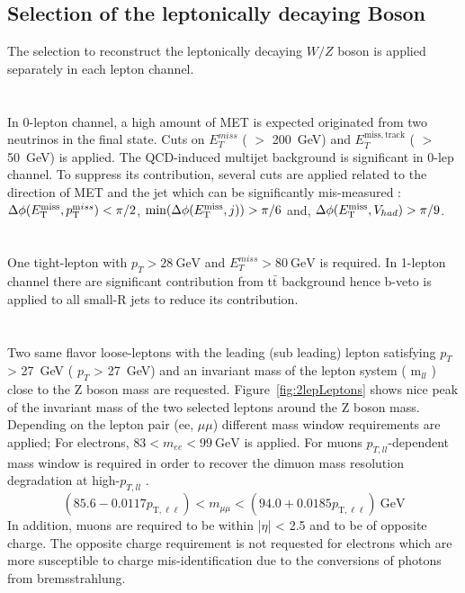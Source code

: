 \subsection{Selection of the leptonically decaying Boson}
The selection to reconstruct the leptonically decaying $W/Z$ boson is applied separately in each lepton channel. \\ \\
\noindent\textbf{}  \\
In 0-lepton channel, a high amount of MET is expected originated from two neutrinos in the final state. Cuts on $E^{miss}_T$ ( $>$ 200~GeV) and $E^{\mathrm{miss,track}}_T$ ( $>$ 50~GeV) is applied. The QCD-induced multijet background is significant in 0-lep channel. 
To suppress its contribution, several cuts are applied related to the direction of MET and the jet which can be significantly mis-measured : $\Delta\phi(E_\mathrm{T}^\mathrm{miss},p_{{\textrm T}}^{{\textrm miss}}) < \pi/2$, $\min(\Delta\phi(E_\mathrm{T}^\mathrm{miss},j)) > \pi/6$ and, $\Delta\phi(E_\mathrm{T}^\mathrm{miss}, V_{had}) > \pi/9$. \\ \\ 
\noindent\textbf{}  \\
One tight-lepton with $p_T > 28~\mathrm{GeV}$ and $E^{miss}_T > 80~\mathrm{GeV}$ is required. In 1-lepton channel there are significant contribution from t$\bar{\mathrm{t}}$ background hence b-veto is applied to all small-R jets to reduce its contribution.\\ \\
\noindent\textbf{}  \\
Two same flavor loose-leptons with the leading (sub leading) lepton satisfying $p_T$ > 27~GeV ( $p_T$ > 27~GeV) and an invariant mass of the lepton system ( m$_{ll}$ ) close to the Z boson mass are requested. Figure~\ref{fig:2lepLeptons} shows nice peak of the invariant mass of the two selected leptons around the Z boson mass. Depending on the lepton pair (ee, $\mu\mu$) different mass
window requirements are applied; For electrons, $83<m_{ee}<99 ~\mathrm{GeV}$ is applied. For muons $p_{T,ll}$-dependent mass window is required in order to recover the dimuon mass resolution degradation at high-$p_{T,ll}$ \cite{EXOT-2016-29}.
\begin{equation*}
\left(85.6-0.0117 p_{\mathrm{T}, \ell \ell}\right)<m_{\mu \mu}<\left(94.0+0.0185 p_{\mathrm{T}, \ell \ell}\right) ~\mathrm{GeV}
\end{equation*}
In addition, muons are required to be within |$\eta$| < 2.5 and to be of opposite charge. 
The opposite charge requirement is not requested for electrons which are more susceptible to charge mis-identification due to the conversions of photons from bremsstrahlung.

